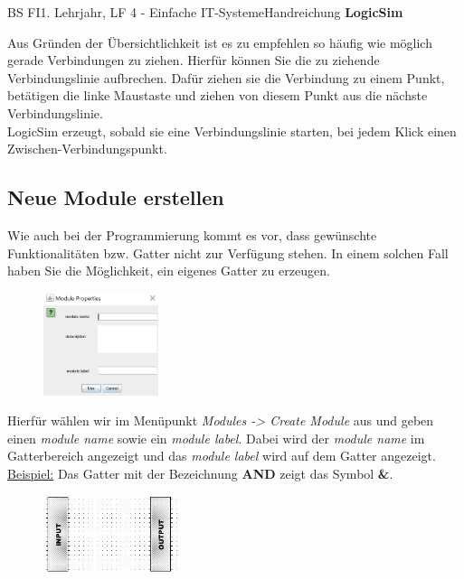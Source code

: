 \documentclass[11pt,oneside,openany,headings=optiontotoc,11pt,numbers=noenddot]{article}
\begin{document}
\begin{worksheet}{BS FI}{1. Lehrjahr, LF 4 - Einfache IT-Systeme}{Handreichung \textbf{LogicSim}}
\begin{figure}
		\end{figure}
		Aus Gründen der Übersichtlichkeit ist es zu empfehlen so häufig wie möglich gerade Verbindungen zu ziehen. Hierfür können Sie die zu ziehende Verbindungslinie aufbrechen. Dafür ziehen sie die Verbindung zu einem Punkt, betätigen die linke Maustaste und ziehen von diesem Punkt aus die nächste Verbindungslinie.\\
		LogicSim erzeugt, sobald sie eine Verbindungslinie starten, bei jedem Klick einen Zwischen-Verbindungspunkt.\\
		\subsection{Neue Module erstellen}
		Wie auch bei der Programmierung kommt es vor, dass gewünschte Funktionalitäten bzw. Gatter nicht zur Verfügung stehen. In einem solchen Fall haben Sie die Möglichkeit, ein eigenes Gatter zu erzeugen.\\
		\par\noindent
		\begin{figure}
			\vspace{-20pt}
			\includegraphics[width=0.3\textwidth,align=t]{../99_Bilder/new_mod.jpg}
		\end{figure}
		Hierfür wählen wir im Menüpunkt \textit{Modules -> Create Module} aus und geben einen \textit{module name} sowie ein \textit{module label}. Dabei wird der \textit{module name} im Gatterbereich angezeigt und das \textit{module label} wird auf dem Gatter angezeigt.\\
		\underline{Beispiel:} Das Gatter mit der Bezeichnung \textbf{AND} zeigt das Symbol \textbf{\&}.\\
		\par\bigskip\noindent
		\begin{figure}
			\vspace{-10pt}
			\hspace{-25pt}
			\includegraphics[width=0.35\textwidth]{../99_Bilder/inout.jpg}

\end{figure}
\end{worksheet}
\end{document}
